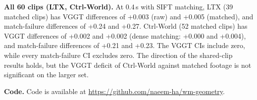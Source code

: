 \documentclass{article}
\begin{document}
\textbf{All 60 clips (LTX, Ctrl-World).} At 0.4\,s with SIFT matching, LTX (39 matched clips) has VGGT
differences of +0.003 (raw) and +0.005 (matched), and match-failure differences of +0.24 and +0.27.
Ctrl-World (52 matched clips) has VGGT differences of +0.002 and +0.002 (dense matching: +0.000 and
+0.004), and match-failure differences of +0.21 and +0.23. The VGGT CIs include zero, while every
match-failure CI excludes zero. The direction of the shared-clip results holds, but the VGGT deficit
of Ctrl-World against matched footage is not significant on the larger set.

\textbf{Code.} Code is available at \url{https://github.com/naeem-ha/wm-geometry}.
\end{document}
